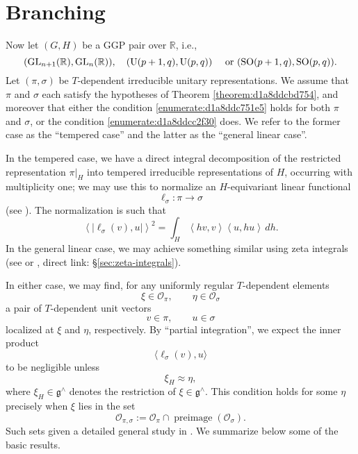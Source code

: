 \documentclass[reqno]{amsart} 
\numberwithin{equation}{section}
\numberwithin{theorem}{section}
\begin{document}
\section{Branching}\label{sec:d1a8de615a31}
Now let $(G,H)$ be a GGP pair over $\mathbb{R}$, i.e.,
\begin{equation*}
  (\operatorname{GL}_{n+1}(\mathbb{R}), \operatorname{GL}_n(\mathbb{R})),
  \quad
  (\operatorname{U}(p+1,q), \operatorname{U}(p,q))
  \quad
  \text{ or } 
  (\operatorname{SO}(p+1,q), \operatorname{SO}(p,q)).
\end{equation*}
Let $(\pi,\sigma)$ be $T$-dependent irreducible unitary representations.  We assume that $\pi$ and $\sigma$ each satisfy the hypotheses of Theorem \ref{theorem:d1a8ddcbd754}, and moreover that either the condition \eqref{enumerate:d1a8ddc751e5} holds for both $\pi$ and $\sigma$, or the condition \eqref{enumerate:d1a8ddcc2f30} does.  We refer to the former case as the ``tempered case'' and the latter as the ``general linear case''.

In the tempered case, we have a direct integral decomposition of the restricted representation $\pi|_{H}$ into tempered irreducible representations of $H$, occurring with multiplicity one; we may use this to normalize an $H$-equivariant linear functional
\begin{equation*}
  \ell_\sigma : \pi \rightarrow \sigma
\end{equation*}
(see \cite[\S18]{nelson-venkatesh-1}).  The normalization is such that
\begin{equation}\label{eqn:d1a8de462057}
  \left\langle \left\lvert \ell_\sigma(v), u \right\rvert \right\rangle^2
  = \int_{H} \left\langle h v, v \right\rangle \left\langle u , h u  \right\rangle \, d h.
\end{equation}
In the general linear case, we may achieve something similar using zeta integrals (see \cite{MR701565} or \cite[\S2.14.4]{2021arXiv210915230N}, direct link: \S\ref{sec:zeta-integrals}).

In either case, we may find, for any uniformly regular $T$-dependent elements
\begin{equation*}
  \xi \in \mathcal{O}_\pi, \qquad  \eta \in \mathcal{O}_\sigma
\end{equation*}
a pair of $T$-dependent unit vectors
\begin{equation*}
  v \in \pi, \qquad u \in \sigma 
\end{equation*}
localized at $\xi$ and $\eta$, respectively.  By ``partial integration'', we expect the inner product
\begin{equation*}
  \langle \ell_\sigma(v), u \rangle
\end{equation*}
to be negligible unless
\begin{equation*}
  \xi_H \approx \eta,
\end{equation*}
where $\xi_H \in \mathfrak{g}^\wedge$ denotes the restriction of $\xi \in \mathfrak{g}^\wedge$.  This condition holds for some $\eta$ precisely when $\xi$ lies in the set
\begin{equation*}
  \mathcal{O}_{\pi,\sigma} := \mathcal{O}_\pi \cap \operatorname{preimage}(\mathcal{O}_\sigma).
\end{equation*}
Such sets given a detailed general study in \cite{nelson-venkatesh-1}.  We summarize below some of the basic results.
\end{document}
